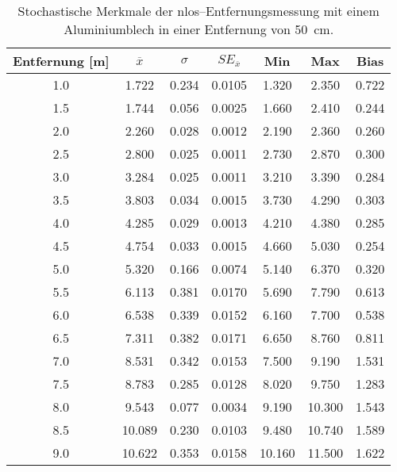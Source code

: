 \begin{appendices}
\begin{table}[h]
	\centering
	\begin{tabular}{||c||ccc||cc||c||}
\hline
Entfernung [\si{\meter}] & $\overline{x}$ & $\sigma$ & $SE_{\overline{x}}$ & Min & Max & Bias \\
\hline
\hline
\num{1.0} & \num{1.722} & \num{0.234} & \num{0.0105} & \num{1.320} & \num{2.350} & \num{0.722} \\
\num{1.5} & \num{1.744} & \num{0.056} & \num{0.0025} & \num{1.660} & \num{2.410} & \num{0.244} \\
\num{2.0} & \num{2.260} & \num{0.028} & \num{0.0012} & \num{2.190} & \num{2.360} & \num{0.260} \\
\num{2.5} & \num{2.800} & \num{0.025} & \num{0.0011} & \num{2.730} & \num{2.870} & \num{0.300} \\
\num{3.0} & \num{3.284} & \num{0.025} & \num{0.0011} & \num{3.210} & \num{3.390} & \num{0.284} \\
\num{3.5} & \num{3.803} & \num{0.034} & \num{0.0015} & \num{3.730} & \num{4.290} & \num{0.303} \\
\num{4.0} & \num{4.285} & \num{0.029} & \num{0.0013} & \num{4.210} & \num{4.380} & \num{0.285} \\
\num{4.5} & \num{4.754} & \num{0.033} & \num{0.0015} & \num{4.660} & \num{5.030} & \num{0.254} \\
\num{5.0} & \num{5.320} & \num{0.166} & \num{0.0074} & \num{5.140} & \num{6.370} & \num{0.320} \\
\num{5.5} & \num{6.113} & \num{0.381} & \num{0.0170} & \num{5.690} & \num{7.790} & \num{0.613} \\
\num{6.0} & \num{6.538} & \num{0.339} & \num{0.0152} & \num{6.160} & \num{7.700} & \num{0.538} \\
\num{6.5} & \num{7.311} & \num{0.382} & \num{0.0171} & \num{6.650} & \num{8.760} & \num{0.811} \\
\num{7.0} & \num{8.531} & \num{0.342} & \num{0.0153} & \num{7.500} & \num{9.190} & \num{1.531} \\
\num{7.5} & \num{8.783} & \num{0.285} & \num{0.0128} & \num{8.020} & \num{9.750} & \num{1.283} \\
\num{8.0} & \num{9.543} & \num{0.077} & \num{0.0034} & \num{9.190} & \num{10.300} & \num{1.543} \\
\num{8.5} & \num{10.089} & \num{0.230} & \num{0.0103} & \num{9.480} & \num{10.740} & \num{1.589} \\
\num{9.0} & \num{10.622} & \num{0.353} & \num{0.0158} & \num{10.160} & \num{11.500} & \num{1.622} \\
\hline
	\end{tabular}
	\caption{Stochastische Merkmale der \Gls{nlos}--Entfernungsmessung mit einem Aluminiumblech in einer Entfernung von \SI{50}{\centi\meter}.}
	\label{tab:entfernungsmessung_2018_01_20_nlos_metal2}
\end{table}





\end{appendices}
